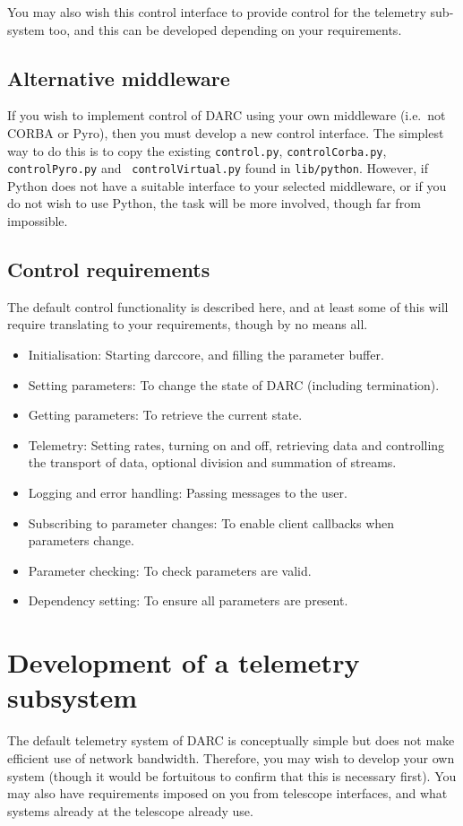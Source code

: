 \documentclass[a4,10pt]{article}
\begin{document}
You may also wish this control interface to provide control for the
telemetry sub-system too, and this can be developed depending on your
requirements.

\subsection{Alternative middleware}
If you wish to implement control of DARC using your own middleware
(i.e.\ not CORBA or Pyro), then you must develop a new control
interface.  The simplest way to do this is to copy the existing
{\tt control.py}, {\tt controlCorba.py}, {\tt controlPyro.py} and {\tt
  controlVirtual.py} found in {\tt lib/python}.  However, if Python
does not have a suitable interface to your selected middleware, or if
you do not wish to use Python, the task will be more involved, though
far from impossible.

\subsection{Control requirements}
The default control functionality is described here, and at least some
of this will require translating to your requirements, though by no
means all.

\begin{itemize}
\item Initialisation:  Starting darccore, and filling the parameter
  buffer.
\item Setting parameters:  To change the state of DARC (including termination).
\item Getting parameters:  To retrieve the current state.
\item Telemetry:  Setting rates, turning on and off, retrieving
  data and controlling the transport of data, optional division and
  summation of streams.
\item Logging and error handling: Passing messages to the user.
\item Subscribing to parameter changes: To enable client callbacks
  when parameters change.
\item Parameter checking:  To check parameters are valid.
\item Dependency setting:  To ensure all parameters are present.
\end{itemize}

\section{Development of a telemetry subsystem}
The default telemetry system of DARC is conceptually simple but does
not make efficient use of network bandwidth.  Therefore, you may wish
to develop your own system (though it would be fortuitous to confirm
that this is necessary first).  You may also have requirements imposed
on you from telescope interfaces, and what systems already at the
telescope already use.  
\end{document}
